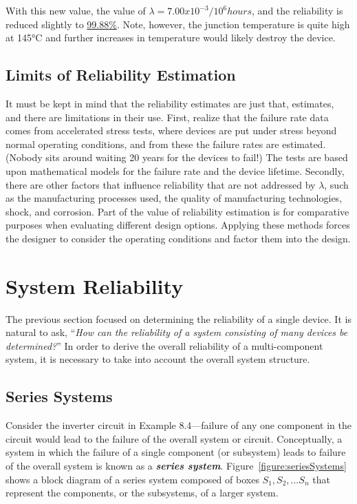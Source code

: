 {With this new value, the value of $\lambda=7.00x10^{-3}/10^6 hours$, and 
the reliability is reduced slightly to \ul{99.88\%}. Note, however, the junction 
temperature is
quite high at 145°C and further increases in temperature would likely
destroy the device.

\subsection{Limits of Reliability Estimation}
\label{subsection:limits-of-reliability-estimation}

It must be kept in mind that the reliability estimates are just that,
estimates, and there are limitations in their use. First, realize that
the failure rate data comes from accelerated stress tests, where devices
are put under stress beyond normal operating conditions, and from these
the failure rates are estimated. (Nobody sits around waiting 20 years
for the devices to fail!) The tests are based upon mathematical models
for the failure rate and the device lifetime. Secondly, there are other
factors that influence reliability that are not addressed by $\lambda$,
such as the manufacturing processes used, the quality of manufacturing
technologies, shock, and corrosion. Part of the value of reliability
estimation is for comparative purposes when evaluating different design
options. Applying these methods forces the designer to consider the
operating conditions and factor them into the design.

\section{System Reliability}
\label{section:system-reliability-1}

The previous section focused on determining the reliability of a single
device. It is natural to ask, ``\emph{How can the reliability of a
system consisting of many devices be determined?}'' In order to derive
the overall reliability of a multi-component system, it is necessary to
take into account the overall system structure.

\subsection{Series Systems}
\label{subsection:series-systems}

Consider the inverter circuit in Example 8.4---failure of any one
component in the circuit would lead to the failure of the overall system
or circuit. Conceptually, a system in which the failure of a single
component (or subsystem) leads to failure of the overall system is known
as a \emph{\textbf{series system}}. Figure~\ref{figure:seriesSystems}
shows a block diagram of a series system composed of boxes
$S_1, S_2, \ldots S_n$ that represent the components,
or the subsystems, of a larger system.

}
